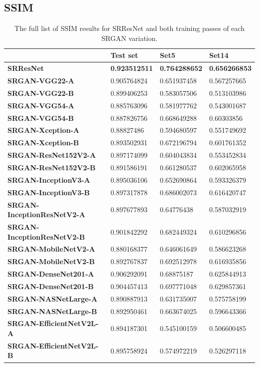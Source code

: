 \begin{appendices}
\section{SSIM}
\begin{table}[h!]
    \centering
    \begin{tabular}{llll}
        \toprule
        \textbf{} & \textbf{Test set} & \textbf{Set5} & \textbf{Set14} \\
        \midrule
        \textbf{SRResNet} & \textbf{0.923512511} & \textbf{0.764288652} & \textbf{0.656266853} \\ 
        \textbf{SRGAN-VGG22-A} & 0.905764824 & 0.651937458 & 0.567257665 \\ 
        \textbf{SRGAN-VGG22-B} & 0.899406253 & 0.583057506 & 0.513103986 \\ 
        \textbf{SRGAN-VGG54-A} & 0.885763096 & 0.581977762 & 0.543001687 \\ 
        \textbf{SRGAN-VGG54-B} & 0.887826756 & 0.668649288 & 0.60303856 \\ 
        \textbf{SRGAN-Xception-A} & 0.88827486 & 0.594680597 & 0.551749692 \\ 
        \textbf{SRGAN-Xception-B} & 0.893502931 & 0.672196794 & 0.601761352 \\ 
        \textbf{SRGAN-ResNet152V2-A} & 0.897174099 & 0.604043834 & 0.553452834 \\ 
        \textbf{SRGAN-ResNet152V2-B} & 0.891586191 & 0.661280537 & 0.602065958 \\ 
        \textbf{SRGAN-InceptionV3-A} & 0.895036106 & 0.652690864 & 0.593326379 \\ 
        \textbf{SRGAN-InceptionV3-B} & 0.897317878 & 0.686002073 & 0.616420747 \\ 
        \textbf{SRGAN-InceptionResNetV2-A} & 0.897677893 & 0.64776438 & 0.587032919 \\ 
        \textbf{SRGAN-InceptionResNetV2-B} & 0.901842292 & 0.682449324 & 0.610296856 \\ 
        \textbf{SRGAN-MobileNetV2-A} & 0.880168377 & 0.646061649 & 0.586623268 \\ 
        \textbf{SRGAN-MobileNetV2-B} & 0.892767837 & 0.692512978 & 0.616935856 \\ 
        \textbf{SRGAN-DenseNet201-A} & 0.906292091 & 0.68875187 & 0.625844913 \\ 
        \textbf{SRGAN-DenseNet201-B} & 0.904457413 & 0.697771048 & 0.629857361 \\ 
        \textbf{SRGAN-NASNetLarge-A} & 0.890887913 & 0.631735007 & 0.575758199 \\ 
        \textbf{SRGAN-NASNetLarge-B} & 0.892950461 & 0.663674025 & 0.596643366 \\ 
        \textbf{SRGAN-EfficientNetV2L-A} & 0.894187301 & 0.545100159 & 0.506600485 \\ 
        \textbf{SRGAN-EfficientNetV2L-B} & 0.895758924 & 0.574972219 & 0.526297118 \\
        \bottomrule
    \end{tabular}
    \caption{The full list of SSIM results for SRResNet and both training passes of each SRGAN variation.}
\end{table}
\clearpage

\end{appendices}

